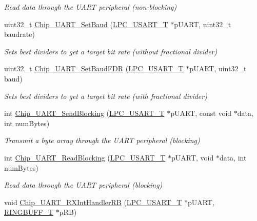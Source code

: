 \begin{DoxyCompactItemize}
\begin{DoxyCompactList}\small\item\em Read data through the U\+A\+RT peripheral (non-\/blocking) \end{DoxyCompactList}\item 
uint32\+\_\+t \hyperlink{group___u_a_r_t__18_x_x__43_x_x_ga19f24dcf53316cbfb204003f506d5be5}{Chip\+\_\+\+U\+A\+R\+T\+\_\+\+Set\+Baud} (\hyperlink{struct_l_p_c___u_s_a_r_t___t}{L\+P\+C\+\_\+\+U\+S\+A\+R\+T\+\_\+T} $\ast$p\+U\+A\+RT, uint32\+\_\+t baudrate)
\begin{DoxyCompactList}\small\item\em Sets best dividers to get a target bit rate (without fractional divider) \end{DoxyCompactList}\item 
uint32\+\_\+t \hyperlink{group___u_a_r_t__18_x_x__43_x_x_gaf8be13555496e013bb747c19134db9e1}{Chip\+\_\+\+U\+A\+R\+T\+\_\+\+Set\+Baud\+F\+DR} (\hyperlink{struct_l_p_c___u_s_a_r_t___t}{L\+P\+C\+\_\+\+U\+S\+A\+R\+T\+\_\+T} $\ast$p\+U\+A\+RT, uint32\+\_\+t baud)
\begin{DoxyCompactList}\small\item\em Sets best dividers to get a target bit rate (with fractional divider) \end{DoxyCompactList}\item 
int \hyperlink{group___u_a_r_t__18_x_x__43_x_x_gad2e45d820abdd0e1790ebd61938c100a}{Chip\+\_\+\+U\+A\+R\+T\+\_\+\+Send\+Blocking} (\hyperlink{struct_l_p_c___u_s_a_r_t___t}{L\+P\+C\+\_\+\+U\+S\+A\+R\+T\+\_\+T} $\ast$p\+U\+A\+RT, const void $\ast$data, int num\+Bytes)
\begin{DoxyCompactList}\small\item\em Transmit a byte array through the U\+A\+RT peripheral (blocking) \end{DoxyCompactList}\item 
int \hyperlink{group___u_a_r_t__18_x_x__43_x_x_ga2b256d39f2fde9f8b923a2f341f5fea3}{Chip\+\_\+\+U\+A\+R\+T\+\_\+\+Read\+Blocking} (\hyperlink{struct_l_p_c___u_s_a_r_t___t}{L\+P\+C\+\_\+\+U\+S\+A\+R\+T\+\_\+T} $\ast$p\+U\+A\+RT, void $\ast$data, int num\+Bytes)
\begin{DoxyCompactList}\small\item\em Read data through the U\+A\+RT peripheral (blocking) \end{DoxyCompactList}\item 
void \hyperlink{group___u_a_r_t__18_x_x__43_x_x_gafdd19a312a2bed6ff1ccb47d5b68c248}{Chip\+\_\+\+U\+A\+R\+T\+\_\+\+R\+X\+Int\+Handler\+RB} (\hyperlink{struct_l_p_c___u_s_a_r_t___t}{L\+P\+C\+\_\+\+U\+S\+A\+R\+T\+\_\+T} $\ast$p\+U\+A\+RT, \hyperlink{struct_r_i_n_g_b_u_f_f___t}{R\+I\+N\+G\+B\+U\+F\+F\+\_\+T} $\ast$p\+RB)

\end{DoxyCompactItemize}
